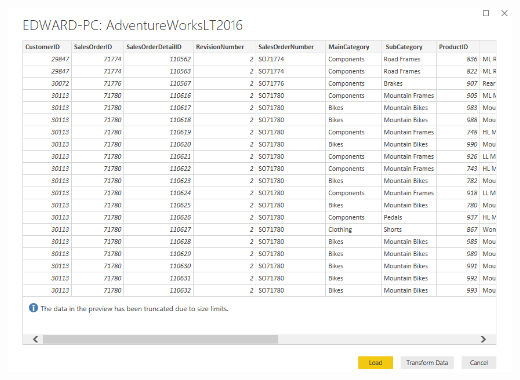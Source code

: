 \documentclass[12pt,letterpaper]{article}
\begin{document}
\begin{center}
\includegraphics[width=15cm]{images/7}\newline
\end{center}
\end{document}
